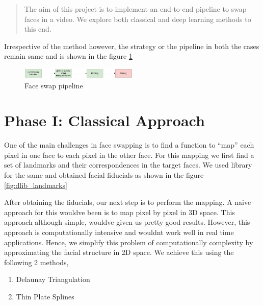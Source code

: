 \documentclass[conference]{IEEEtran}
\begin{document}





%
\IEEEpeerreviewmaketitle

\begin{abstract}
The aim of this project is to implement an end-to-end pipeline to swap faces in a video. We explore both classical and deep learning methods to this end. 
\end{abstract}

Irrespective of the method however, the strategy or the pipeline in both the cases remain same and is shown in the figure \ref{fig:face_swap_pipeline}


\begin{figure}[!h]
    \centering
    \includegraphics[width=0.5\textwidth]{media/face_swap_pipeline.jpg}
    \caption{Face swap pipeline}
    \label{fig:face_swap_pipeline}
\end{figure}

\section{Phase I: Classical Approach}
One of the main challenges in face swapping is to find a function to ``map'' each pixel in one face to each pixel in the other face. For this mapping we first find a set of landmarks and their correspondences in the target faces. We used  library for the same and obtained facial fiducials as shown in the figure \ref{fig:dlib_landmarks}

After obtaining the fiducials, our next step is to perform the mapping. A naive approach for this wouldve been is to map pixel by pixel in 3D space. This approach although simple, wouldve given us pretty good results. However, this approach is computationally intensive and wouldnt work well in real time applications. Hence, we simplify this problem of computationally complexity by approximating the facial structure in 2D space. We achieve this using the following 2 methods,
\begin{enumerate}
    \item Delaunay Triangulation
    \item Thin Plate Splines \cite{tps}
\end{enumerate}
\end{document}
